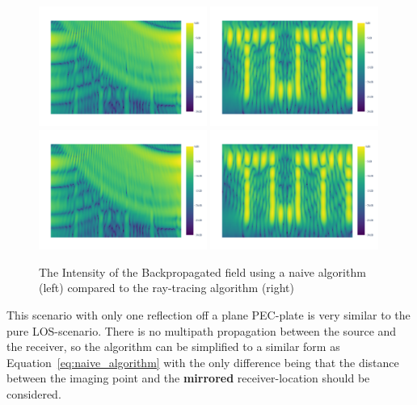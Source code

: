 \begin{figure}[ht]
    \centering
    \includegraphics[page=2, width=0.49\textwidth]{figures/pure_nlos_naive.pdf}
    \includegraphics[page=2, width=0.49\textwidth]{figures/pure_nlos.pdf}
    \includegraphics[page=1, width=0.49\textwidth]{figures/pure_nlos_naive.pdf}
    \includegraphics[page=1, width=0.49\textwidth]{figures/pure_nlos.pdf}
    \caption{The Intensity of the Backpropagated field using a naive algorithm (left) compared to the ray-tracing algorithm (right)}\label{fig:nlos_results}
\end{figure}

This scenario with only one reflection off a plane PEC-plate is very similar to the pure LOS-scenario.
There is no multipath propagation between the source and the receiver, so the algorithm can be simplified to a similar form as Equation~\eqref{eq:naive_algorithm} with the only difference being that the distance between the imaging point and the \textbf{mirrored} receiver-location should be considered.



